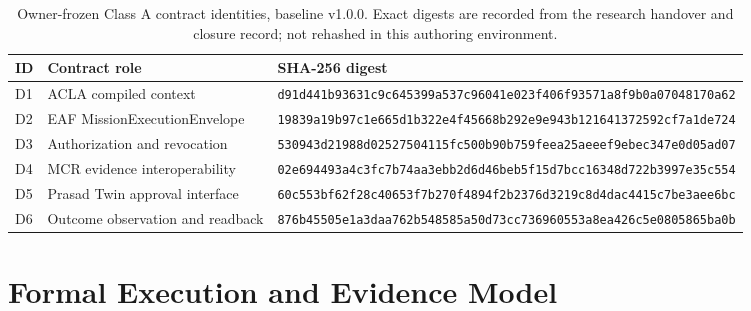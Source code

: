 \documentclass[11pt,twocolumn]{article}
\begin{document}
\begin{table}[t]
\centering\caption{Owner-frozen Class A contract identities, baseline v1.0.0. Exact digests are recorded from the research handover and closure record; not rehashed in this authoring environment.}
\label{tab:contracts}
\small
\begin{tabularx}{\textwidth}{@{}p{}p{}X@{}}
\toprule
\textbf{ID} & \textbf{Contract role} & \textbf{SHA-256 digest}\\\midrule
D1 & ACLA compiled context & \texttt{d91d441b9363\allowbreak 1c9c645399a5\allowbreak 37c96041e023\allowbreak f406f93571a8\allowbreak f9b0a0704817\allowbreak 0a62}\\
D2 & EAF MissionExecutionEnvelope & \texttt{19839a19b97c\allowbreak 1e665d1b322e\allowbreak 4f45668b292e\allowbreak 9e943b121641\allowbreak 372592cf7a1d\allowbreak e724}\\
D3 & Authorization and revocation & \texttt{530943d21988\allowbreak d02527504115\allowbreak fc500b90b759\allowbreak feea25aeeef9\allowbreak ebec347e0d05\allowbreak ad07}\\
D4 & MCR evidence interoperability & \texttt{02e694493a4c\allowbreak 3fc7b74aa3eb\allowbreak b2d6d46beb5f\allowbreak 15d7bcc16348\allowbreak d722b3997e35\allowbreak c554}\\
D5 & Prasad Twin approval interface & \texttt{60c553bf62f2\allowbreak 8c40653f7b27\allowbreak 0f4894f2b237\allowbreak 6d3219c8d4da\allowbreak c4415c7be3ae\allowbreak e6bc}\\
D6 & Outcome observation and readback & \texttt{876b45505e1a\allowbreak 3daa762b5485\allowbreak 85a50d73cc73\allowbreak 6960553a8ea4\allowbreak 26c5e0805865\allowbreak ba0b}\\\bottomrule
\end{tabularx}
\end{table}

\section{Formal Execution and Evidence Model}
\end{document}
